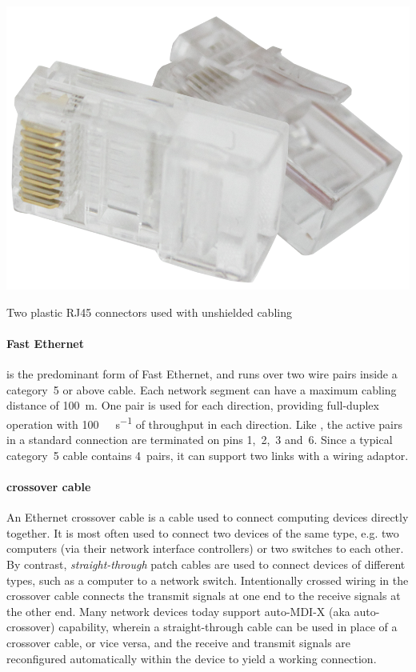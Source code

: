 \begin{marginfigure}
   \centering
   \includegraphics[width=\textwidth]{images/physical/8p8c.png}
   \caption{Two plastic \acs{RJ45} connectors used with unshielded cabling}
   \label{fig:rj45}
\end{marginfigure}

\paragraph{Fast Ethernet}
 is the predominant form of Fast Ethernet, and runs over two wire pairs inside a category~5 or above cable.
Each network segment can have a maximum cabling distance of \SI{100}{\metre}.
One pair is used for each direction, providing full-duplex operation with \SI{100}{\mega\bit\per\second} of throughput in each direction.
Like , the active pairs in a standard connection are terminated on pins 1,~2,~3 and~6.
Since a typical category~5 cable contains 4~pairs, it can support two  links with a wiring adaptor.

\paragraph{crossover cable}
An Ethernet crossover cable is a cable used to connect computing devices directly together.
It is most often used to connect two devices of the same type, e.g. two computers (via their network interface controllers) or two switches to each other.
By contrast, \emph{straight-through} patch cables are used to connect devices of different types, such as a computer to a network switch.
Intentionally crossed wiring in the crossover cable connects the transmit signals at one end to the receive signals at the other end.
Many network devices today support auto-\acs{MDI-X} (aka auto-crossover) capability, wherein a straight-through cable can be used in place of a crossover cable, or vice versa, and the receive and transmit signals are reconfigured automatically within the device to yield a working connection.

